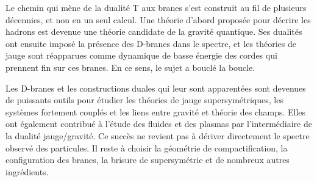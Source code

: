 Le chemin qui mène de la dualité T aux branes s’est construit au fil de plusieurs décennies, et non en un seul calcul. Une théorie d’abord proposée pour décrire les hadrons est devenue une théorie candidate de la gravité quantique. Ses dualités ont ensuite imposé la présence des D-branes dans le spectre, et les théories de jauge sont réapparues comme dynamique de basse énergie des cordes qui prennent fin sur ces branes. En ce sens, le sujet a bouclé la boucle.

Les D-branes et les constructions duales qui leur sont apparentées sont devenues de puissants outils pour étudier les théories de jauge supersymétriques, les systèmes fortement couplés et les liens entre gravité et théorie des champs. Elles ont également contribué à l’étude des fluides et des plasmas par l’intermédiaire de la dualité jauge/gravité. Ce succès ne revient pas à dériver directement le spectre observé des particules. Il reste à choisir la géométrie de compactification, la configuration des branes, la brisure de supersymétrie et de nombreux autres ingrédients.

\begin{classroomqa}
\end{classroomqa}

\begin{classroomqa}
\end{classroomqa}

\begin{classroomqa}
\end{classroomqa}

